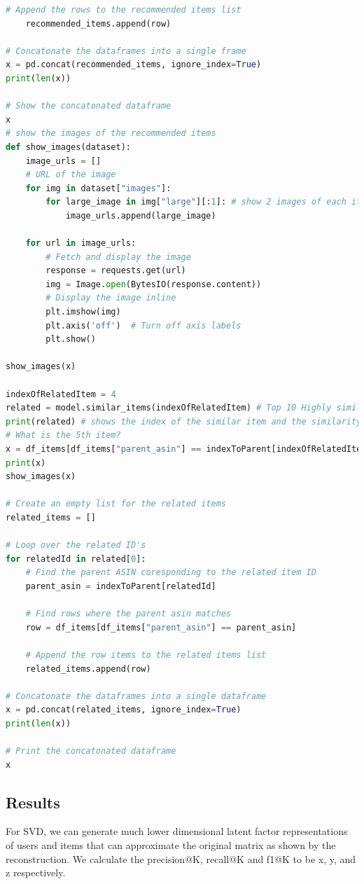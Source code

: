 \documentclass{article}
\begin{document}
\begin{lstlisting}[language=Python ]
    # Append the rows to the recommended items list
    recommended_items.append(row)

# Concatonate the dataframes into a single frame
x = pd.concat(recommended_items, ignore_index=True)
print(len(x))

# Show the concatonated dataframe
x
# show the images of the recommended items
def show_images(dataset):
    image_urls = []
    # URL of the image
    for img in dataset["images"]:
        for large_image in img["large"][:1]: # show 2 images of each item that is recommended
            image_urls.append(large_image)

    for url in image_urls:
        # Fetch and display the image
        response = requests.get(url)
        img = Image.open(BytesIO(response.content))
        # Display the image inline
        plt.imshow(img)
        plt.axis('off')  # Turn off axis labels
        plt.show()

show_images(x)

indexOfRelatedItem = 4
related = model.similar_items(indexOfRelatedItem) # Top 10 Highly similar to the 5th item (using cosine similarity)
print(related) # shows the index of the similar item and the similarity score (sorted from best to least)
# What is the 5th item?
x = df_items[df_items["parent_asin"] == indexToParent[indexOfRelatedItem]]
print(x)
show_images(x)

# Create an empty list for the related items
related_items = []

# Loop over the related ID's
for relatedId in related[0]:
    # Find the parent ASIN coresponding to the related item ID
    parent_asin = indexToParent[relatedId]

    # Find rows where the parent asin matches
    row = df_items[df_items["parent_asin"] == parent_asin]

    # Append the row items to the related items list
    related_items.append(row)

# Concatonate the dataframes into a single dataframe
x = pd.concat(related_items, ignore_index=True)
print(len(x))

# Print the concatonated dataframe
x
\end{lstlisting} 

\subsection{Results}

For SVD, we can generate much lower dimensional latent factor representations of users and items that can approximate the original matrix as shown by the reconstruction.
We calculate the precision@K, recall@K and f1@K to be x, y, and z respectively.
\end{document}
